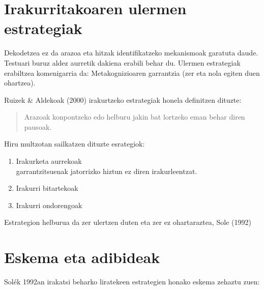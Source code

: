 \documentclass[]{book}
\providecommand{\tightlist}{%
  \setlength{\itemsep}{0pt}\setlength{\parskip}{0pt}}
\begin{document}
\hypertarget{irakurritakoaren-ulermen-estrategiak}{%
\section{Irakurritakoaren ulermen estrategiak}\label{irakurritakoaren-ulermen-estrategiak}}

Dekodetzea ez da arazoa eta hitzak identifikatzeko mekanismoak garatuta daude.
Testuari buruz aldez aurretik dakiena erabili behar du.
Ulermen estrategiak erabiltzea komenigarria da: Metakognizioaren garrantzia (zer eta nola egiten duen ohartzea).

Ruizek \& Aldekoak (2000) irakurtzeko estrategiak honela definitzen dituzte:

\begin{quote}
Arazoak konpontzeko edo helburu jakin bat lortzeko eman behar diren pausoak.
\end{quote}

Hiru multzotan sailkatzen dituzte esrategiok:

\begin{enumerate}
\def\labelenumi{\arabic{enumi}.}
\tightlist
\item
  Irakurketa aurrekoak\\
  garrantzitsuenak jatorrizko hiztun ez diren irakurleentzat.
\item
  Irakurri bitartekoak
\item
  Irakurri ondorengoak
\end{enumerate}

Estrategion helburua da zer ulertzen duten eta zer ez ohartaraztea, Sole (1992)

\hypertarget{eskema-eta-adibideak}{%
\section{Eskema eta adibideak}\label{eskema-eta-adibideak}}

Solék 1992an irakatsi beharko liratekeen estrategien honako eskema zehaztu zuen:
\end{document}
